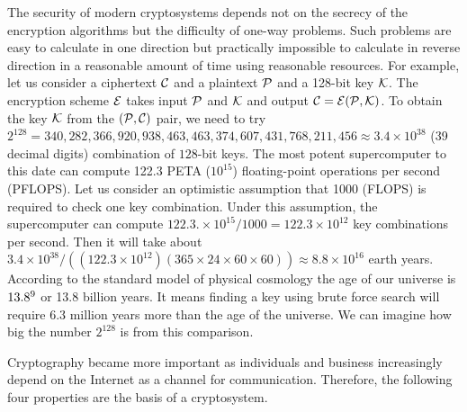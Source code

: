 The security of modern cryptosystems depends not on the secrecy of the encryption algorithms but the difficulty of one-way problems. 
Such problems are easy to calculate in one direction but practically impossible to calculate in reverse direction in a reasonable amount of time using reasonable resources.
For example, let us consider a ciphertext $\cal{C}$ and a plaintext $\cal{P}$ and a 128-bit key $\cal{K}$. 
The encryption scheme $\cal{E}$ takes input $\cal{P}$ and $\cal{K}$ and output $\cal{C}=E( \cal{P}, K)$. 
To obtain the  key $\cal{K}$ from the $(\cal{P,C})$ pair, we need to try $2^{128} = 340,282,366,920,938,463,463,374,607,431,768,211,456 \approx 3.4 \times 10^{38}$ (39 decimal digits) combination of $128$-bit keys.
The most potent supercomputer to this date can compute 122.3 PETA ($10^{15}$) floating-point operations per second (PFLOPS).
Let us consider an optimistic assumption that 1000 (FLOPS) is required to check one key combination.
Under this assumption, the supercomputer can compute $122.3. \times 10^{15} / 1000 = 122.3 \times 10^{12}$ key combinations per second.
Then it will take about $3.4 \times 10^{38}/((122.3 \times 10^{12})(365 \times 24 \times 60 \times 60)) \approx  8.8 \times 10^{16}$ earth years.
According to the standard model of physical cosmology \cite{Ade:2015xua} the age of our universe is $13.8 \time 10^9$ or 13.8 billion years. 
It means finding a key using brute force search will require $6.3$ million years more than the age of the universe.
We can imagine how big the number $2^{128}$ is from this comparison.

Cryptography became more important as individuals and business increasingly depend on the Internet as a channel for communication. Therefore, the following four properties are the basis of a cryptosystem.



